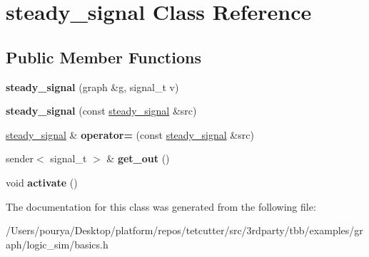 \hypertarget{classsteady__signal}{}\section{steady\+\_\+signal Class Reference}
\label{classsteady__signal}
\subsection*{Public Member Functions}
\begin{DoxyCompactItemize}
\item 
\hypertarget{classsteady__signal_afa0787220078d8f6e2993bcb7c495f27}{}{\bfseries steady\+\_\+signal} (graph \&g, signal\+\_\+t v)\label{classsteady__signal_afa0787220078d8f6e2993bcb7c495f27}

\item 
\hypertarget{classsteady__signal_aaa17c7646dab79a5cd60f7bba1c6f0c9}{}{\bfseries steady\+\_\+signal} (const \hyperlink{classsteady__signal}{steady\+\_\+signal} \&src)\label{classsteady__signal_aaa17c7646dab79a5cd60f7bba1c6f0c9}

\item 
\hypertarget{classsteady__signal_a027fb4eb40eaf214cc9087db1b78f4b9}{}\hyperlink{classsteady__signal}{steady\+\_\+signal} \& {\bfseries operator=} (const \hyperlink{classsteady__signal}{steady\+\_\+signal} \&src)\label{classsteady__signal_a027fb4eb40eaf214cc9087db1b78f4b9}

\item 
\hypertarget{classsteady__signal_a46deda4d1d9e0be61ed2ca19b7df172b}{}sender$<$ signal\+\_\+t $>$ \& {\bfseries get\+\_\+out} ()\label{classsteady__signal_a46deda4d1d9e0be61ed2ca19b7df172b}

\item 
\hypertarget{classsteady__signal_a4aa884d722aafb70ba911609a1f7545e}{}void {\bfseries activate} ()\label{classsteady__signal_a4aa884d722aafb70ba911609a1f7545e}

\end{DoxyCompactItemize}


The documentation for this class was generated from the following file\+:\begin{DoxyCompactItemize}
\item 
/\+Users/pourya/\+Desktop/platform/repos/tetcutter/src/3rdparty/tbb/examples/graph/logic\+\_\+sim/basics.\+h\end{DoxyCompactItemize}
